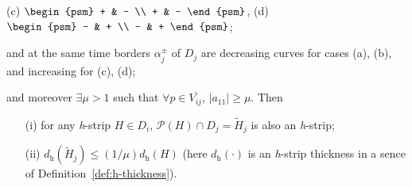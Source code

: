 \begin{theorem*}
\begin{enumerate}
\begin{center}
				(c) $\begin{psm} + & - \\ + & - \end{psm}$, \quad
				(d) $\begin{psm} - & + \\ - & + \end{psm}$;		
			\end{center}
			and at the same time borders $\alpha_j^{\pm}$ of $D_j$ are decreasing curves for cases (a), (b), and increasing for (c), (d);
	\end{enumerate}
	and moreover $\exists \mu > 1$ such that $\forall p \in \overline{V_{ij}}$, $|a_{11}| \ge \mu$.
	Then
	\begin{itemize}
		\item[(i)] for any \emph{h}-strip $H \in D_i$, $\mathcal{P} (H) \cap D_j = \widetilde{H}_j$ is also an \emph{h}-strip;
		\item[(ii)] $d_{\mathrm{h}}(\widetilde{H}_j) \le (1 / \mu) d_{\mathrm{h}}(H)$ (here $d_{\mathrm{h}}(\cdot)$ is an \emph{h}-strip thickness in a sence of Definition~\ref{def:h-thickness}).
	\end{itemize}
\end{theorem*}
